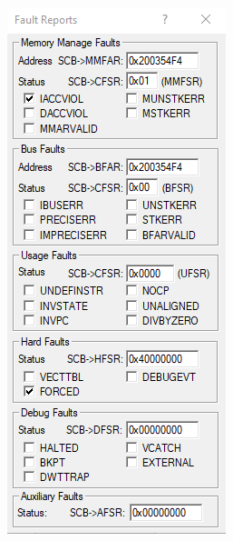 \begin{figure}[h]
\begin{subfigure}[b]{0.3\textwidth}
    \end{subfigure}
    \hspace{1.5cm}
    \begin{subfigure}[b]{0.3\textwidth}
        \centering
        \includegraphics[width=\textwidth]{figures/keil_error_5B500.png}

\end{subfigure}
\end{figure}
